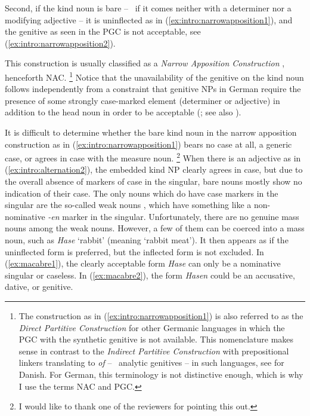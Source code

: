 Second, if the kind noun is bare -- \ie\ if it comes neither with a determiner nor a modifying adjective -- it is uninflected as in (\ref{ex:intro:narrowapposition1}), and the genitive as seen in the PGC is not acceptable, see (\ref{ex:intro:narrowapposition2}).

\begin{exe}
  \ex\label{ex:intro:narrowapposition}
  \begin{xlist}
  \end{xlist}
\end{exe}

This construction is usually classified as a \textit{Narrow Apposition Construction} \citep{Loebel1986}, henceforth NAC.%
\footnote{The construction as in (\ref{ex:intro:narrowapposition1}) is also referred to as the \textit{Direct Partitive Construction} for other Germanic languages in which the PGC with the synthetic genitive is not available.
This nomenclature makes sense in contrast to the \textit{Indirect Partitive Construction} with prepositional linkers translating to \textit{of} -- \ie\ analytic genitives -- in such languages, see \cite{HankamerMikkelsen2008} for Danish.
For German, this terminology is not distinctive enough, which is why I use the terms NAC and PGC.}
Notice that the unavailability of the genitive on the kind noun follows independently from a constraint that genitive NPs in German require the presence of some strongly case-marked element (determiner or adjective) in addition to the head noun in order to be acceptable (\citealp{GallmannLindauer1994,Schachtl1989}; see also \citealp[160]{Eisenberg2013b}).

It is difficult to determine whether the bare kind noun in the narrow apposition construction as in (\ref{ex:intro:narrowapposition1}) bears no case at all, a generic case, or agrees in case with the measure noun.%
\footnote{I would like to thank one of the reviewers for pointing this out.}
When there is an adjective as in (\ref{ex:intro:alternation2}), the embedded kind NP clearly agrees in case, but due to the overall absence of markers of case in the singular, bare nouns mostly show no indication of their case.
The only nouns which do have case markers in the singular are the so-called weak nouns \citep{Koepcke1995,Schaefer2016c}, which have something like a non-nominative \textit{-en} marker in the singular.
Unfortunately, there are no genuine mass nouns among the weak nouns.
However, a few of them can be coerced into a mass noun, such as \textit{Hase} `rabbit' (meaning `rabbit meat').
It then appears as if the uninflected form is preferred, but the inflected form is not excluded.
In (\ref{ex:macabre1}), the clearly acceptable form \textit{Hase} can only be a nominative singular or caseless.
In (\ref{ex:macabre2}), the form \textit{Hasen} could be an accusative, dative, or genitive.

